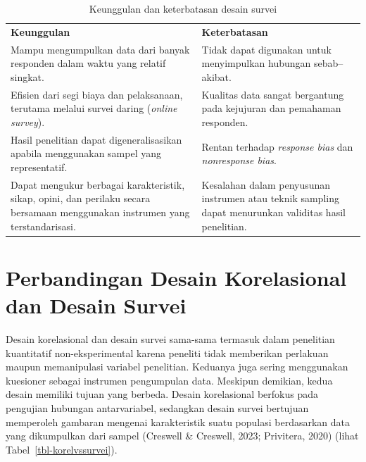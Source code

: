 \documentclass[
  indonesian,
  letterpaper,
  DIV=11,
  numbers=noendperiod]{scrreprt}
\begin{document}
\begin{longtable}[]{@{}
  >{\raggedright\arraybackslash}p{}
  >{\raggedright\arraybackslash}p{}@{}}
\caption{Keunggulan dan keterbatasan desain
survei}\label{tbl-survei}\tabularnewline
\toprule\noalign{}
\endfirsthead
\endhead
\bottomrule\noalign{}
\endlastfoot
\textbf{Keunggulan} & \textbf{Keterbatasan} \\
Mampu mengumpulkan data dari banyak responden dalam waktu yang relatif
singkat. & Tidak dapat digunakan untuk menyimpulkan hubungan
sebab--akibat. \\
Efisien dari segi biaya dan pelaksanaan, terutama melalui survei daring
(\emph{online survey}). & Kualitas data sangat bergantung pada kejujuran
dan pemahaman responden. \\
Hasil penelitian dapat digeneralisasikan apabila menggunakan sampel yang
representatif. & Rentan terhadap \emph{response bias} dan
\emph{nonresponse bias}. \\
Dapat mengukur berbagai karakteristik, sikap, opini, dan perilaku secara
bersamaan menggunakan instrumen yang terstandarisasi. & Kesalahan dalam
penyusunan instrumen atau teknik sampling dapat menurunkan validitas
hasil penelitian. \\
\end{longtable}

\section{Perbandingan Desain Korelasional dan Desain
Survei}\label{perbandingan-desain-korelasional-dan-desain-survei}

Desain korelasional dan desain survei sama-sama termasuk dalam
penelitian kuantitatif non-eksperimental karena peneliti tidak
memberikan perlakuan maupun memanipulasi variabel penelitian. Keduanya
juga sering menggunakan kuesioner sebagai instrumen pengumpulan data.
Meskipun demikian, kedua desain memiliki tujuan yang berbeda. Desain
korelasional berfokus pada pengujian hubungan antarvariabel, sedangkan
desain survei bertujuan memperoleh gambaran mengenai karakteristik suatu
populasi berdasarkan data yang dikumpulkan dari sampel (Creswell \&
Creswell, 2023; Privitera, 2020) (lihat Tabel~\ref{tbl-korelvssurvei}).
\end{document}
